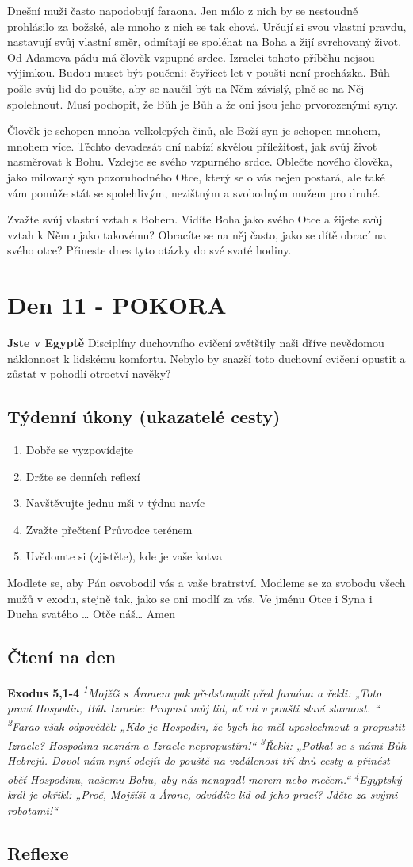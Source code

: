 \documentclass[11pt]{article}
\newcommand{\zacatekDruhyTyden}{
  \textbf{Jste v Egyptě} \newline
  Disciplíny duchovního cvičení zvětštily naši dříve nevědomou náklonnost k lidskému komfortu.
  Nebylo by snazší toto duchovní cvičení opustit a zůstat v pohodlí otroctví navěky?

  \subsection*{Týdenní úkony (ukazatelé cesty)}
\begin{enumerate}
  \item Dobře se vyzpovídejte
  \item Držte se denních reflexí
  \item Navštěvujte jednu mši v týdnu navíc
  \item Zvažte přečtení Průvodce terénem
  \item Uvědomte si (zjistěte), kde je vaše kotva
\end{enumerate}
Modlete se, aby Pán osvobodil vás a vaše bratrství. \newline
Modleme se za svobodu všech mužů v exodu, stejně tak, jako se oni modlí za vás.\newline
Ve jménu Otce i Syna i Ducha svatého …  Otče náš… Amen
}
\begin{document}
Dnešní muži často napodobují faraona. Jen málo z nich by se nestoudně prohlásilo za božské, ale mnoho z nich se
tak chová. Určují si svou vlastní pravdu, nastavují svůj vlastní směr, odmítají se spoléhat na Boha a žijí svrchovaný
život. Od Adamova pádu má člověk vzpupné srdce. Izraelci tohoto příběhu nejsou výjimkou. Budou muset být
poučeni: čtyřicet let v poušti není procházka. Bůh pošle svůj lid do poušte, aby se naučil být na Něm závislý, plně se
na Něj spolehnout. Musí pochopit, že Bůh je Bůh a že oni jsou jeho prvorozenými syny.

Člověk je schopen mnoha velkolepých činů, ale Boží syn je schopen mnohem, mnohem více. Těchto devadesát dní
nabízí skvělou příležitost, jak svůj život nasměrovat k Bohu. Vzdejte se svého vzpurného srdce. Oblečte nového
člověka, jako milovaný syn pozoruhodného Otce, který se o vás nejen postará, ale také vám pomůže stát se
spolehlivým, nezištným a svobodným mužem pro druhé.

Zvažte svůj vlastní vztah s Bohem. Vidíte Boha jako svého Otce a žijete svůj vztah k Němu jako takovému?
Obracíte se na něj často, jako se dítě obrací na svého otce? Přineste dnes tyto otázky do své svaté hodiny.

\newpage
\section{Den 11 - POKORA}
\zacatekDruhyTyden
\subsection*{Čtení na den}
\textbf{Exodus 5,1-4}
\newline
\textit{
\textsuperscript{1}Mojžíš s Áronem pak předstoupili před faraóna a řekli: „Toto praví Hospodin, Bůh Izraele: Propusť můj lid, ať mi v poušti slaví slavnost. “
\textsuperscript{2}Farao však odpověděl: „Kdo je Hospodin, že bych ho měl uposlechnout a propustit Izraele? Hospodina neznám a Izraele nepropustím!“
\textsuperscript{3}Řekli: „Potkal se s námi Bůh Hebrejů. Dovol nám nyní odejít do pouště na vzdálenost tří dnů cesty a přinést oběť Hospodinu, našemu Bohu, aby nás nenapadl morem nebo mečem.“
\textsuperscript{4}Egyptský král je okřikl: „Proč, Mojžíši a Árone, odvádíte lid od jeho prací? Jděte za svými robotami!“
}

\newpage
\subsection*{Reflexe}
\end{document}
